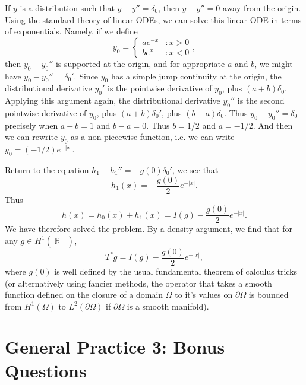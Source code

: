 \documentclass[answers]{exam}
\DeclareMathOperator{\RR}{\mathbb{R}}
\begin{document}
\begin{questions}
\begin{parts}
\begin{solution}
		If $y$ is a distribution such that $y - y'' = \delta_0$, then $y - y'' = 0$ away from the origin. Using the standard theory of linear ODEs, we can solve this linear ODE in terms of exponentials. Namely, if we define
		\[ y_0 = \begin{cases} a e^{-x} &: x > 0 \\ b e^x &: x < 0 \end{cases}, \]
		then $y_0 - y_0''$ is supported at the origin, and for appropriate $a$ and $b$, we might have $y_0 - y_0'' = \delta_0'$. Since $y_0$ has a simple jump continuity at the origin, the distributional derivative $y_0'$ is the pointwise derivative of $y_0$, plus $(a + b) \delta_0$. Applying this argument again, the distributional derivative $y_0''$ is the second pointwise derivative of $y_0$, plus $(a + b) \delta_0'$, plus $(b-a) \delta_0$. Thus $y_0 - y_0'' = \delta_0$ precisely when $a + b = 1$ and $b - a = 0$. Thus $b = 1/2$ and $a = -1/2$. And then we can rewrite $y_0$ as a non-piecewise function, i.e. we can write $y_0 = (-1/2) e^{-|x|}$.

		Return to the equation $h_1 - h_1'' = - g(0) \delta_0'$, we see that
		\[ h_1(x) = - \frac{g(0)}{2} e^{-|x|}. \]
		Thus
		\[ h(x) = h_0(x) + h_1(x) = I(g) - \frac{g(0)}{2} e^{-|x|}. \]
		We have therefore solved the problem. By a density argument, we find that for any $g \in H^1(\RR^+)$,
		\[ T^*g = I(g) - \frac{g(0)}{2} e^{-|x|}, \]
		where $g(0)$ is well defined by the usual fundamental theorem of calculus tricks (or alternatively using fancier methods, the operator that takes a smooth function defined on the closure of a domain $\Omega$ to it's values on $\partial \Omega$ is bounded from $H^1(\Omega)$ to $L^2(\partial \Omega)$ if $\partial \Omega$ is a smooth manifold).
\end{solution}

\end{parts}







\newpage
\section{General Practice 3: Bonus Questions}


\end{questions}
\end{document}
